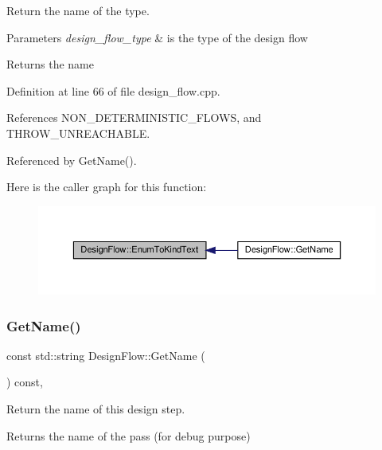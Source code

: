 Return the name of the type. 


\begin{DoxyParams}{Parameters}
{\em design\+\_\+flow\+\_\+type} & is the type of the design flow \\
\hline
\end{DoxyParams}
\begin{DoxyReturn}{Returns}
the name 
\end{DoxyReturn}


Definition at line 66 of file design\+\_\+flow.\+cpp.



References N\+O\+N\+\_\+\+D\+E\+T\+E\+R\+M\+I\+N\+I\+S\+T\+I\+C\+\_\+\+F\+L\+O\+WS, and T\+H\+R\+O\+W\+\_\+\+U\+N\+R\+E\+A\+C\+H\+A\+B\+LE.



Referenced by Get\+Name().

Here is the caller graph for this function\+:
\nopagebreak
\begin{figure}[H]
\begin{center}
\leavevmode
\includegraphics[width=350pt]{d2/d61/classDesignFlow_ad561ebde784b2bd0afd84a526a19a836_icgraph}
\end{center}
\end{figure}
\mbox{\label{classDesignFlow_aa8b86491bfa371d09a22f863df1c5be8}} 
\subsubsection{\texorpdfstring{Get\+Name()}{GetName()}}
{\footnotesize\ttfamily const std\+::string Design\+Flow\+::\+Get\+Name (\begin{DoxyParamCaption}{ }\end{DoxyParamCaption}) const\hspace{0.3cm}{\ttfamily [override]}, {\ttfamily [virtual]}}



Return the name of this design step. 

\begin{DoxyReturn}{Returns}
the name of the pass (for debug purpose) 
\end{DoxyReturn}


